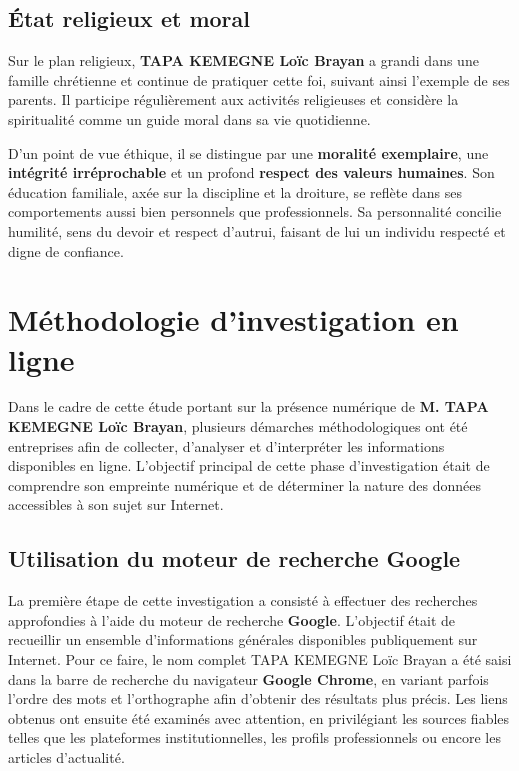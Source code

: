 \documentclass[12pt, a4em]{article}
\begin{document}
	\subsection{État religieux et moral}
	
	Sur le plan religieux, \textbf{TAPA KEMEGNE Loïc Brayan} a grandi dans une famille chrétienne et continue de pratiquer cette foi, suivant ainsi l’exemple de ses parents. 
	Il participe régulièrement aux activités religieuses et considère la spiritualité comme un guide moral dans sa vie quotidienne.
	
	D’un point de vue éthique, il se distingue par une \textbf{moralité exemplaire}, une \textbf{intégrité irréprochable} et un profond \textbf{respect des valeurs humaines}. 
	Son éducation familiale, axée sur la discipline et la droiture, se reflète dans ses comportements aussi bien personnels que professionnels. 
	Sa personnalité concilie humilité, sens du devoir et respect d’autrui, faisant de lui un individu respecté et digne de confiance.
	
	 
	\section{Méthodologie d’investigation en ligne}
	
	Dans le cadre de cette étude portant sur la présence numérique de \textbf{M. TAPA KEMEGNE Loïc Brayan}, plusieurs démarches méthodologiques ont été entreprises afin de collecter, d’analyser et d’interpréter les informations disponibles en ligne. 
	L’objectif principal de cette phase d’investigation était de comprendre son empreinte numérique et de déterminer la nature des données accessibles à son sujet sur Internet.
	
	\subsection{Utilisation du moteur de recherche Google}
	
	La première étape de cette investigation a consisté à effectuer des recherches approfondies à l’aide du moteur de recherche \textbf{Google}. 
	L’objectif était de recueillir un ensemble d’informations générales disponibles publiquement sur Internet. 
	Pour ce faire, le nom complet \og TAPA KEMEGNE Loïc Brayan \fg{} a été saisi dans la barre de recherche du navigateur \textbf{Google Chrome}, en variant parfois l’ordre des mots et l’orthographe afin d’obtenir des résultats plus précis. 
	Les liens obtenus ont ensuite été examinés avec attention, en privilégiant les sources fiables telles que les plateformes institutionnelles, les profils professionnels ou encore les articles d’actualité.
	
\end{document}
